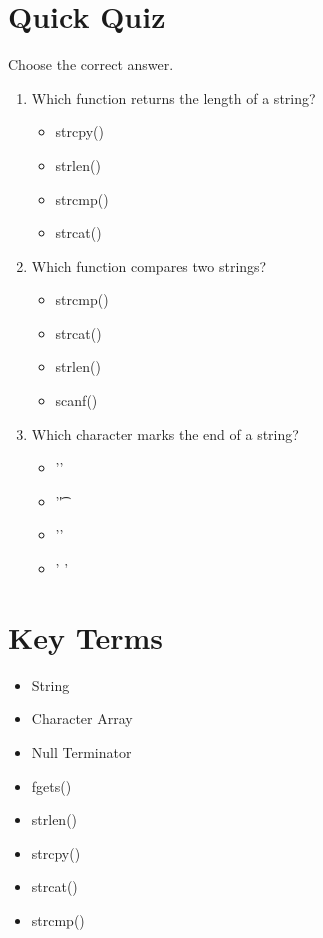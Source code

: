\documentclass[12pt,openany]{book}
\begin{document}
\section{Quick Quiz}

Choose the correct answer.

\begin{enumerate}
    \item Which function returns the length of a string?
    \begin{itemize}
        \item strcpy()
        \item strlen()
        \item strcmp()
        \item strcat()
    \end{itemize}

    \item Which function compares two strings?
    \begin{itemize}
        \item strcmp()
        \item strcat()
        \item strlen()
        \item scanf()
    \end{itemize}

    \item Which character marks the end of a string?
    \begin{itemize}
        \item '\n'
        \item '\t'
        \item '\0'
        \item ' '
    \end{itemize}
\end{enumerate}

\section{Key Terms}

\begin{itemize}
    \item String
    \item Character Array
    \item Null Terminator
    \item fgets()
    \item strlen()
    \item strcpy()
    \item strcat()
    \item strcmp()
\end{itemize}
\end{document}
